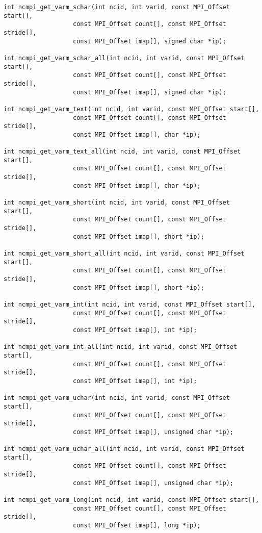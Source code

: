 \begin{verbatim}
int ncmpi_get_varm_schar(int ncid, int varid, const MPI_Offset start[],
                   const MPI_Offset count[], const MPI_Offset stride[],
                   const MPI_Offset imap[], signed char *ip); 

int ncmpi_get_varm_schar_all(int ncid, int varid, const MPI_Offset start[],
                   const MPI_Offset count[], const MPI_Offset stride[],
                   const MPI_Offset imap[], signed char *ip); 

int ncmpi_get_varm_text(int ncid, int varid, const MPI_Offset start[],
                   const MPI_Offset count[], const MPI_Offset stride[],
                   const MPI_Offset imap[], char *ip); 

int ncmpi_get_varm_text_all(int ncid, int varid, const MPI_Offset start[],
                   const MPI_Offset count[], const MPI_Offset stride[],
                   const MPI_Offset imap[], char *ip); 

int ncmpi_get_varm_short(int ncid, int varid, const MPI_Offset start[],
                   const MPI_Offset count[], const MPI_Offset stride[],
                   const MPI_Offset imap[], short *ip); 

int ncmpi_get_varm_short_all(int ncid, int varid, const MPI_Offset start[],
                   const MPI_Offset count[], const MPI_Offset stride[],
                   const MPI_Offset imap[], short *ip); 

int ncmpi_get_varm_int(int ncid, int varid, const MPI_Offset start[],
                   const MPI_Offset count[], const MPI_Offset stride[],
                   const MPI_Offset imap[], int *ip); 

int ncmpi_get_varm_int_all(int ncid, int varid, const MPI_Offset start[],
                   const MPI_Offset count[], const MPI_Offset stride[],
                   const MPI_Offset imap[], int *ip); 

int ncmpi_get_varm_uchar(int ncid, int varid, const MPI_Offset start[],
                   const MPI_Offset count[], const MPI_Offset stride[],
                   const MPI_Offset imap[], unsigned char *ip); 

int ncmpi_get_varm_uchar_all(int ncid, int varid, const MPI_Offset start[],
                   const MPI_Offset count[], const MPI_Offset stride[],
                   const MPI_Offset imap[], unsigned char *ip); 

int ncmpi_get_varm_long(int ncid, int varid, const MPI_Offset start[],
                   const MPI_Offset count[], const MPI_Offset stride[],
                   const MPI_Offset imap[], long *ip);


\end{verbatim}
